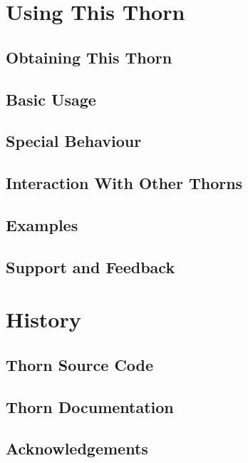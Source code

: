 \section{Using This Thorn}

\subsection{Obtaining This Thorn}

\subsection{Basic Usage}

\subsection{Special Behaviour}

\subsection{Interaction With Other Thorns}

\subsection{Examples}

\subsection{Support and Feedback}

\section{History}

\subsection{Thorn Source Code}

\subsection{Thorn Documentation}

\subsection{Acknowledgements}


\begin{thebibliography}{9}

\end{thebibliography}

